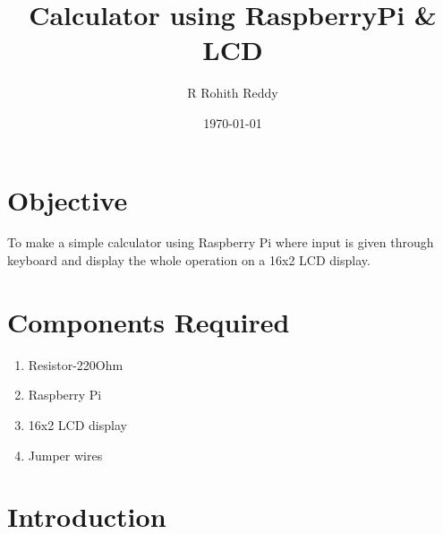 \documentclass[11pt]{article}
\begin{document}
\title{Calculator using RaspberryPi \& LCD}
\author{R Rohith Reddy}
\date{\today}
\maketitle


\section{Objective}
	To make a simple calculator using Raspberry Pi where input is given through keyboard and display the whole operation on a 16x2 LCD display.
\section{Components Required}
\begin{enumerate}
 	\item Resistor-220Ohm
 	\item Raspberry Pi
 	\item 16x2 LCD display
 	\item Jumper wires
\end{enumerate}

\section{Introduction}
\end{document}
